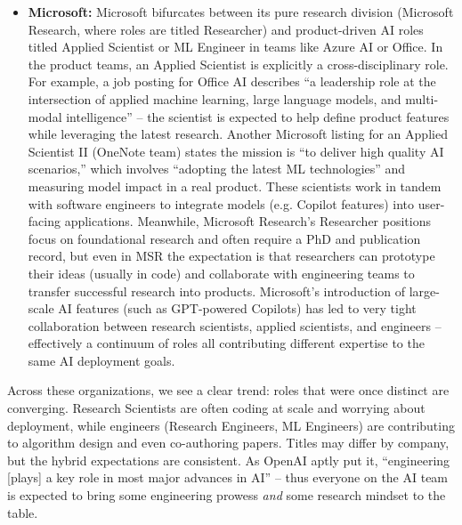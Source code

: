 \documentclass[pdflatex,sn-mathphys-num]{sn-jnl}%
\theoremstyle{thmstyleone}%
\theoremstyle{thmstyletwo}%
\theoremstyle{thmstylethree}%
\begin{document}
\begin{itemize}
\item \textbf{Microsoft:} Microsoft bifurcates between its pure research division (Microsoft Research, where roles are titled Researcher) and product-driven AI roles titled Applied Scientist or ML Engineer in teams like Azure AI or Office. In the product teams, an Applied Scientist is explicitly a cross-disciplinary role. For example, a job posting for Office AI describes “a leadership role at the intersection of applied machine learning, large language models, and multi-modal intelligence” – the scientist is expected to help define product features while leveraging the latest research. Another Microsoft listing for an Applied Scientist II (OneNote team) states the mission is “to deliver high quality AI scenarios,” which involves “adopting the latest ML technologies” and measuring model impact in a real product. These scientists work in tandem with software engineers to integrate models (e.g. Copilot features) into user-facing applications. Meanwhile, Microsoft Research’s Researcher positions focus on foundational research and often require a PhD and publication record, but even in MSR the expectation is that researchers can prototype their ideas (usually in code) and collaborate with engineering teams to transfer successful research into products. Microsoft’s introduction of large-scale AI features (such as GPT-powered Copilots) has led to very tight collaboration between research scientists, applied scientists, and engineers – effectively a continuum of roles all contributing different expertise to the same AI deployment goals. 
\end{itemize}



\noindent Across these organizations, we see a clear trend: roles that were once distinct are converging. Research Scientists are often coding at scale and worrying about deployment, while engineers (Research Engineers, ML Engineers) are contributing to algorithm design and even co-authoring papers. Titles may differ by company, but the hybrid expectations are consistent. As OpenAI aptly put it, “engineering [plays] a key role in most major advances in AI”\cite{OpenAI-RE-Job} – thus everyone on the AI team is expected to bring some engineering prowess \emph{and} some research mindset to the table.
\end{document}
